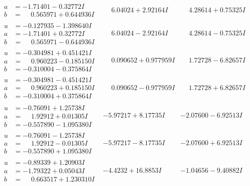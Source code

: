 \documentclass[1p]{elsarticle_modified}
\theoremstyle{definition}
\begin{document}
$$\begin{array}{c|c|c}
\begin{aligned}
a &= -1.71401 - 0.32772 I \\
b &= \phantom{-}0.565971 + 0.644936 I\end{aligned}
 & \phantom{-}6.04024 + 2.92164 I & \phantom{-}4.28614 + 0.75325 I \\ \hline\begin{aligned}
u &= -0.127935 - 1.398640 I \\
a &= -1.71401 + 0.32772 I \\
b &= \phantom{-}0.565971 - 0.644936 I\end{aligned}
 & \phantom{-}6.04024 - 2.92164 I & \phantom{-}4.28614 - 0.75325 I \\ \hline\begin{aligned}
u &= -0.304981 + 0.451421 I \\
a &= \phantom{-}0.960223 - 0.185150 I \\
b &= -0.310004 - 0.375864 I\end{aligned}
 & \phantom{-}0.090652 + 0.977959 I & \phantom{-}1.72728 - 6.82657 I \\ \hline\begin{aligned}
u &= -0.304981 - 0.451421 I \\
a &= \phantom{-}0.960223 + 0.185150 I \\
b &= -0.310004 + 0.375864 I\end{aligned}
 & \phantom{-}0.090652 - 0.977959 I & \phantom{-}1.72728 + 6.82657 I \\ \hline\begin{aligned}
u &= -0.76091 + 1.25738 I \\
a &= \phantom{-}1.92912 + 0.01305 I \\
b &= -0.557890 - 1.095380 I\end{aligned}
 & -5.97217 + 8.17735 I & -2.07600 - 6.92513 I \\ \hline\begin{aligned}
u &= -0.76091 - 1.25738 I \\
a &= \phantom{-}1.92912 - 0.01305 I \\
b &= -0.557890 + 1.095380 I\end{aligned}
 & -5.97217 - 8.17735 I & -2.07600 + 6.92513 I \\ \hline\begin{aligned}
u &= -0.89339 + 1.20903 I \\
a &= -1.79322 + 0.05043 I \\
b &= \phantom{-}0.663517 + 1.230310 I\end{aligned}
 & -4.4232 + 16.8853 I & -1.04656 - 9.40882 I \\ \hline\begin{aligned}

\end{aligned}
\end{array}$$
\end{document}
